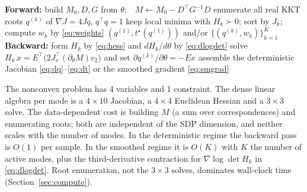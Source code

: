 \begin{algorithm}[t]
\caption{Forward and backward pass of \textsc{Laplace-QPEPLayer} (one batch element).}
\label{alg:layer}
\begin{algorithmic}[1]
\State \textbf{Forward:}
\State build $M_0,D,G$ from $\theta$;\ \ $M\gets M_0-D^\top G^{-1}D$
\State enumerate all real KKT roots $q^{(k)}$ of $\nabla J=4Jq$, $q^\top q=1$
\State keep local minima with $H_k\succ0$; sort by $J_k$; compute $w_k$ by \eqref{eq:weights}
\State \Return $(q^{(1)},t^\star(q^{(1)}))$ and/or $\{(q^{(k)},w_k)\}_{k=1}^{K}$
\State \textbf{Backward:}
  \State form $H_k$ by \eqref{eq:hess} and $dH_k/d\theta$ by \eqref{eq:dlogdet}
  \State solve $H_k\,x=E^\top\big(2J_v^\top(\partial_\theta M)v_2\big)$ and set $\partial q^{(k)}/\partial\theta=-Ex$
\EndFor
\State assemble the deterministic Jacobian \eqref{eq:dq}--\eqref{eq:dt} or the smoothed gradient \eqref{eq:smgrad}
\end{algorithmic}
\end{algorithm}

The nonconvex problem has 4 variables and 1 constraint. The dense linear algebra per mode is a $4\times10$ Jacobian, a $4\times4$ Euclidean Hessian and a $3\times3$ solve. The data-dependent cost is building $M$ (a sum over correspondences) and enumerating roots; both are independent of the SDP dimension, and neither scales with the number of modes. In the deterministic regime the backward pass is $O(1)$ per sample. In the smoothed regime it is $O(K)$ with $K$ the number of active modes, plus the third-derivative contraction for $\nabla\log\det H_k$ in \eqref{eq:dlogdet}. Root enumeration, not the $3\times3$ solves, dominates wall-clock time (Section~\ref{sec:compute}).
